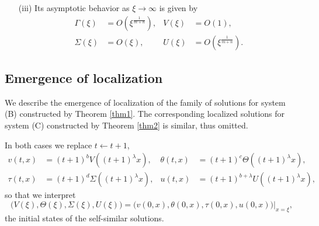 \documentclass[graybox]{svmult}
\begin{document}
\begin{theorem}
\begin{enumerate}
\begin{equation}
  \end{equation}
  \item[(iii)] Its asymptotic behavior as $\xi \rightarrow \infty$ is given by
  \begin{equation} \label{eq:ss_asympC1}
  \begin{aligned}
    \Gamma(\xi) &= O(\xi^{\frac{1}{m+n}}), & V(\xi) &= O(1), \\%
   \Sigma(\xi) &= O(\xi), &   U(\xi) &= O(\xi^{\frac{1}{m+n}}).
  \end{aligned}
  \end{equation}
 \end{enumerate}
\end{theorem}

\subsection{Emergence of localization}
We describe the emergence of localization of the family of solutions for system (B)  constructed by Theorem \ref{thm1}. The corresponding localized solutions for system (C) constructed by Theorem \ref{thm2} is similar, thus omitted. 

In both cases we replace $t \leftarrow t+1$,
\begin{equation*}
\begin{aligned}
 v(t,x) &= (t+1)^b V((t+1)^\lambda x),  & \theta(t,x) &= (t+1)^c \Theta((t+1)^\lambda x), \\
 \tau(t,x) &= (t+1)^d \Sigma((t+1)^\lambda x), & u(t,x) &= (t+1)^{b+\lambda} U((t+1)^\lambda x),
\end{aligned}
\end{equation*}
so that we interpret 
$$\big(V(\xi),\Theta(\xi),\Sigma(\xi),U(\xi)\big)=\big(v(0,x),\theta(0,x),\tau(0,x),u(0,x)\big)|_{x=\xi},$$  the initial states of the self-similar solutions. 
\end{document}
